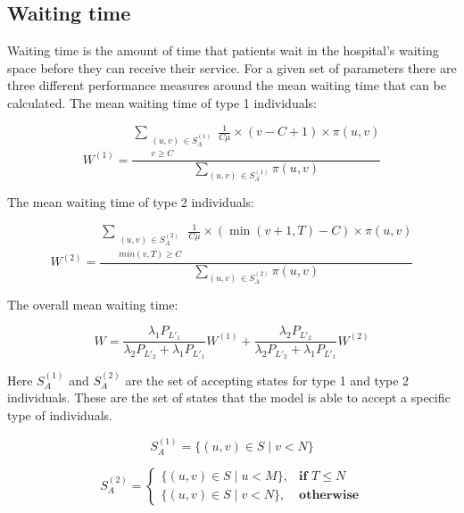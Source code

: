 \subsection{Waiting time} \label{sec:waiting_time}

Waiting time is the amount of time that patients wait in 
the hospital's waiting space before they can receive their service. 
For a given set of parameters there are three different performance measures 
around the mean waiting time that can be calculated. The mean waiting time of
type 1 individuals:

\begin{equation} \label{eq:closed_form_waiting_type_1}
    W^{(1)} = \frac{\sum_{\substack{(u,v) \, \in S_A^{(1)} \\ v \geq C}} 
    \frac{1}{C \mu} \times (v-C+1) \times \pi(u,v)}{\sum_{(u,v) \, 
    \in S_A^{(1)}} \pi(u,v)}
\end{equation}

The mean waiting time of type 2 individuals:

\begin{equation}\label{eq:closed_form_waiting_type_2}
    W^{(2)} = \frac{\sum_{\substack{(u,v) \, \in S_A^{(2)} \\ min(v,T) \geq C}} 
    \frac{1}{C \mu} \times (\min(v+1,T)-C) \times \pi(u,v)}{\sum_{(u,v) \, 
    \in S_A^{(2)}} \pi(u,v)}
\end{equation} 

The overall mean waiting time:

\begin{equation}\label{eq:overall_waiting_time}
    W = \frac{\lambda_1 P_{L'_1}}{\lambda_2 P_{L'_2} + \lambda_1 P_{L'_1}} W^{(1)} 
    + \frac{\lambda_2 P_{L'_2}}{\lambda_2 P_{L'_2} + \lambda_1 P_{L'_1}} W^{(2)}
\end{equation}
 
Here \(S_A^{(1)}\) and \(S_A^{(2)}\) are the set of accepting states for type
1 and type 2 individuals. These are the set of states that the model is able
to accept a specific type of individuals.

\begin{equation}\label{eq:accepting_states_type_1}
    S_A^{(1)} = \{(u, v) \in S \; | \; v < N \}
\end{equation}

\begin{equation}\label{eq:accepting_states_type_2}
    S_A^{(2)}=
    \begin{cases}
        \{(u, v) \in S \; | \; u < M \}, & \textbf{if } T \leq N\\
        \{(u, v) \in S \; | \; v < N \}, & \textbf{otherwise}
    \end{cases}
\end{equation}

